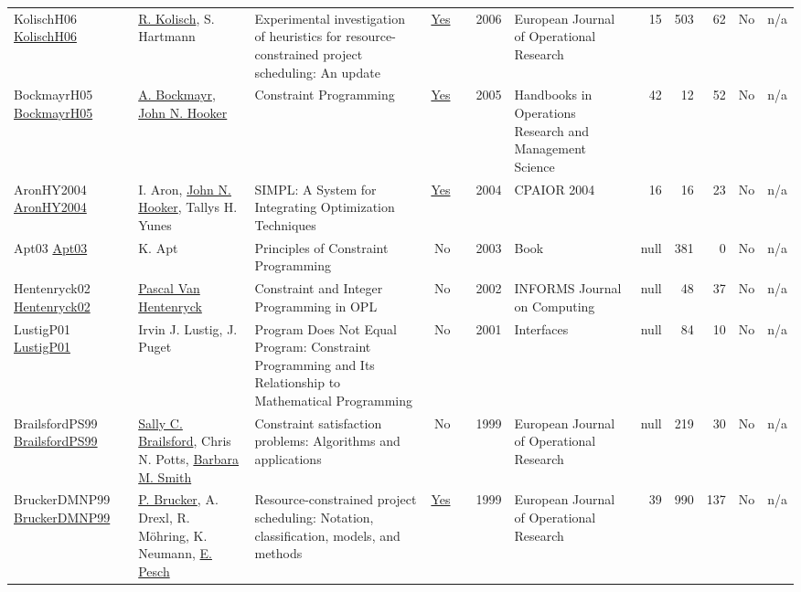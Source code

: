 {\begin{longtable}{>{\raggedright\arraybackslash}p{3cm}>{\raggedright\arraybackslash}p{6cm}>{\raggedright\arraybackslash}p{6.5cm}rrrp{2.5cm}rrrrr}
KolischH06 \href{http://dx.doi.org/10.1016/j.ejor.2005.01.065}{KolischH06} & \hyperref[auth:a445]{R. Kolisch}, S. Hartmann & Experimental investigation of heuristics for resource-constrained project scheduling: An update & \href{../works/KolischH06.pdf}{Yes} & \cite{KolischH06} & 2006 & European Journal of Operational Research & 15 & 503 & 62 & No & n/a\\
BockmayrH05 \href{http://dx.doi.org/10.1016/s0927-0507(05)12010-6}{BockmayrH05} & \hyperref[auth:a918]{A. Bockmayr}, \hyperref[auth:a161]{John N. Hooker} & Constraint Programming & \href{../works/BockmayrH05.pdf}{Yes} & \cite{BockmayrH05} & 2005 & Handbooks in Operations Research and Management Science & 42 & 12 & 52 & No & n/a\\
AronHY2004 \href{http://dx.doi.org/10.1007/978-3-540-24664-0_2}{AronHY2004} & I. Aron, \hyperref[auth:a161]{John N. Hooker}, Tallys H. Yunes & SIMPL: A System for Integrating Optimization Techniques & \href{../works/AronHY2004.pdf}{Yes} & \cite{AronHY2004} & 2004 & CPAIOR 2004 & 16 & 16 & 23 & No & n/a\\
Apt03 \href{http://dx.doi.org/10.1017/cbo9780511615320}{Apt03} & K. Apt & Principles of Constraint Programming & No & \cite{Apt03} & 2003 & Book & null & 381 & 0 & No & n/a\\
Hentenryck02 \href{http://dx.doi.org/10.1287/ijoc.14.4.345.2826}{Hentenryck02} & \hyperref[auth:a149]{Pascal Van Hentenryck} & Constraint and Integer Programming in OPL & No & \cite{Hentenryck02} & 2002 & INFORMS Journal on Computing & null & 48 & 37 & No & n/a\\
LustigP01 \href{http://dx.doi.org/10.1287/inte.31.6.29.9647}{LustigP01} & Irvin J. Lustig, J. Puget & Program Does Not Equal Program: Constraint Programming and Its Relationship to Mathematical Programming & No & \cite{LustigP01} & 2001 & Interfaces & null & 84 & 10 & No & n/a\\
BrailsfordPS99 \href{http://dx.doi.org/10.1016/s0377-2217(98)00364-6}{BrailsfordPS99} & \hyperref[auth:a1069]{Sally C. Brailsford}, Chris N. Potts, \hyperref[auth:a1071]{Barbara M. Smith} & Constraint satisfaction problems: Algorithms and applications & No & \cite{BrailsfordPS99} & 1999 & European Journal of Operational Research & null & 219 & 30 & No & n/a\\
BruckerDMNP99 \href{http://dx.doi.org/10.1016/s0377-2217(98)00204-5}{BruckerDMNP99} & \hyperref[auth:a856]{P. Brucker}, A. Drexl, R. M\"{o}hring, K. Neumann, \hyperref[auth:a443]{E. Pesch} & Resource-constrained project scheduling: Notation,  classification,  models,  and methods & \href{../works/BruckerDMNP99.pdf}{Yes} & \cite{BruckerDMNP99} & 1999 & European Journal of Operational Research & 39 & 990 & 137 & No & n/a\\

\end{longtable}}
